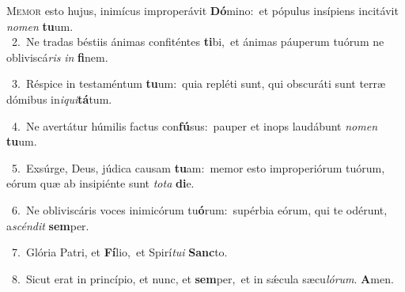 \lettrine{\initial\textcolor{\initialcolor}{M}}{emor} esto hujus, inimícus improperávit \textbf{Dó}\-mino:~\star et pópulus insípiens incitávit \textit{no}\-\textit{men} \textbf{tu}\-um.\\
{\numbfont\textcolor{\numbcolor}{~2.}}~Ne tradas béstiis ánimas confiténtes \textbf{ti}\-bi,~\star et ánimas páuperum tuórum ne obliviscá\textit{ris} \textit{in} \textbf{fi}\-nem.\par
{\numbfont\textcolor{\numbcolor}{~3.}}~Réspice in testaméntum \textbf{tu}\-um:~\star quia repléti sunt, qui obscuráti sunt terræ dómibus in\-\textit{i}\-\textit{qui}\textbf{tá}tum.\par
{\numbfont\textcolor{\numbcolor}{~4.}}~Ne avertátur húmilis factus con\-\textbf{fú}\-sus:~\star pauper et inops laudábunt \textit{no}\-\textit{men} \textbf{tu}\-um.\par
{\numbfont\textcolor{\numbcolor}{~5.}}~Exsúrge, Deus, júdica causam \textbf{tu}\-am:~\star memor esto improperiórum tuórum, eórum quæ ab insipiénte sunt \textit{to}\-\textit{ta} \textbf{di}\-e.\par
{\numbfont\textcolor{\numbcolor}{~6.}}~Ne obliviscáris voces inimicórum tu\-\textbf{ó}\-rum:~\star supérbia eórum, qui te odérunt, a\-\textit{scén}\-\textit{dit} \textbf{sem}\-per.\par
{\numbfont\textcolor{\numbcolor}{~7.}}~Glória Patri, et \textbf{Fí}\-lio,~\star et Spirí\-\textit{tu}\-\textit{i} \textbf{Sanc}\-to.\par
{\numbfont\textcolor{\numbcolor}{~8.}}~Sicut erat in princípio, et nunc, et \textbf{sem}\-per,~\star et in sǽcula sæcu\-\textit{ló}\-\textit{rum}. \textbf{A}\-men.\par
